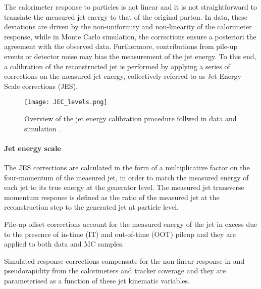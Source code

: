 The calorimeter response to particles is not linear and it is not straightforward to translate the measured jet energy
to that of the original parton.
In data, these deviations are driven by the non-uniformity and non-linearity of the calorimeter response,
while in Monte Carlo simulation, the corrections ensure a posteriori the agreement with the observed data.
Furthermore, contributions from pile-up events or detector noise may bias the measurement of the jet energy.
To this end, a calibration of the reconstructed jet is performed by applying a series of corrections on the measured jet energy,
collectively referred to as Jet Energy Scale corrections (JES).

\begin{figure}
\centering
\texttt{[image: JEC\_levels.png]}
\caption{Overview of the jet energy calibration procedure follwed in data and simulation~\cite{CMS-JME-13-004}.}
\label{fig:JECoverview}
\end{figure}


\paragraph{Jet energy scale\\}
The JES corrections are calculated in the form of a multiplicative factor on the four-momentum of the measured jet,
in order to match the measured energy of each jet to its true energy at the generator level.
The measured jet transverse momentum response is defined as the ratio of the measured jet \pt at the reconstruction step to the generated jet at particle level.

Pile-up offset corrections account for the measured energy of the jet in excess due to
the presence of in-time (IT) and out-of-time (OOT) pileup
and they are applied to both data and MC samples.

Simulated response corrections compensate for the non-linear response in \pt and pseudorapidity
from the calorimeters and tracker coverage and they are parameterised as a function of these jet kinematic variables.

